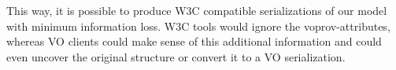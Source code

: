 This way, it is possible to produce W3C compatible serializations of our model with minimum information loss. W3C tools would ignore the voprov-attributes, whereas VO clients could make sense of this additional information and could even uncover the original structure or convert it to a VO serialization.




